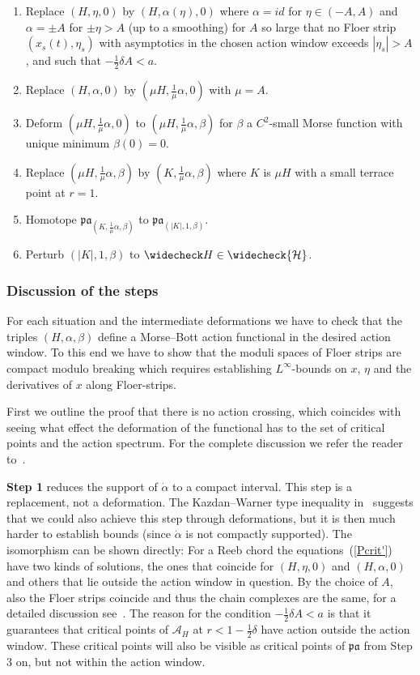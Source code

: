 \documentclass{amsart}
\newcommand{\Acal}{{\mathcal{A}}}
\newcommand{\Hcal}{{\mathcal{H}}}
\newcommand{\pacal}{\mathfrak{pa}}
\theoremstyle{definition}
\theoremstyle{remark}
\numberwithin{equation}{section}
\begin{document}
\begin{enumerate}
	\item Replace $(H,\eta,0)$ by $(H,\alpha(\eta),0)$ where $\alpha=id$ for $\eta\in(-A,A)$ and $\alpha=\pm A$ for $\pm\eta>A$ (up to a smoothing) for $A$ so large that no Floer strip $(x_s(t),\eta_s)$ with asymptotics in the chosen action window exceeds $|\eta_s|>A$, and such that $-\frac12\delta A<a$.
	\item Replace $(H,\alpha,0)$ by $(\mu H,\frac 1\mu \alpha,0)$ with $\mu=A$.
	\item Deform $(\mu H,\frac1\mu \alpha,0)$ to $(\mu H,\frac1\mu \alpha,\beta)$ for $\beta$ a $C^2$-small Morse function with unique minimum $\beta(0)=0$.
	\item Replace $(\mu H,\frac1\mu \alpha,\beta)$ by $(K,\frac1\mu \alpha,\beta)$ where $K$ is $\mu H$ with a small terrace point at $r=1$.
	\item Homotope $\pacal_{(K,\frac1\mu \alpha,\beta)}$ to $\pacal_{(|K|,1,\beta)}$. 
	\item Perturb $(|K|,1,\beta)$ to $\widecheck H\in\widecheck\Hcal$.  
\end{enumerate}

\subsubsection*{Discussion of the steps}
For each situation and the intermediate deformations we have to check that the triples $(H,\alpha,\beta)$ define a Morse--Bott action functional in the desired action window. To this end we have to show that the moduli spaces of Floer strips are compact modulo breaking which requires establishing $L^\infty$-bounds on $x$, $\eta$ and the derivatives of $x$ along Floer-strips. 

First we outline the proof that there is no action crossing, which coincides with seeing what effect the deformation of the functional has to the set of critical points and the action spectrum. For the complete discussion we refer the reader to~\cite[Section 6]{CFO10}.

\textbf{Step 1} reduces the support of $\dot\alpha$ to a compact interval. This step is a replacement, not a deformation. The Kazdan--Warner type inequality in~\cite{CFO10} suggests that we could also achieve this step through deformations, but it is then much harder to establish bounds (since $\dot\alpha$ is not compactly supported). The isomorphism can be shown directly: For a Reeb chord the equations~(\ref{Pcrit'}) have two kinds of solutions, the ones that coincide for $(H,\eta,0)$ and $(H,\alpha,0)$ and others that lie outside the action window in question. By the choice of $A$, also the Floer strips coincide and thus the chain complexes are the same, for a detailed discussion see~\cite[Section 5.4]{CFO10}. The reason for the condition $-\frac12\delta A<a$ is that it guarantees that critical points of $\Acal_H$ at $r<1-\frac12\delta$ have action outside the action window. These critical points will also be visible as critical points of $\pacal$ from Step 3 on, but not within the action window. 
\end{document}
